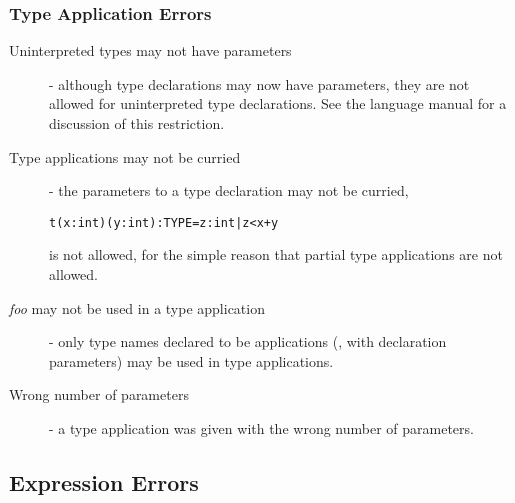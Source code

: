 \subsubsection{Type Application Errors}

\begin{description}

\item[Uninterpreted types may not have parameters] - although type
declarations may now have parameters, they are not allowed for
uninterpreted type declarations.  See the language manual for a discussion
of this restriction.

\item[Type applications may not be curried] - the parameters to a type
declaration may not be curried, \eg\
\begin{alltt}
  t(x:int)(y:int): TYPE = {z:int | z < x + y}
\end{alltt}
is not allowed, for the simple reason that partial type applications are
not allowed.

\item[\emph{foo} may not be used in a type application] - only type names
declared to be applications (\ie, with declaration parameters) may be used
in type applications.

\item[Wrong number of parameters] - a type application was given with the
wrong number of parameters.

\end{description}


\subsection{Expression Errors}

